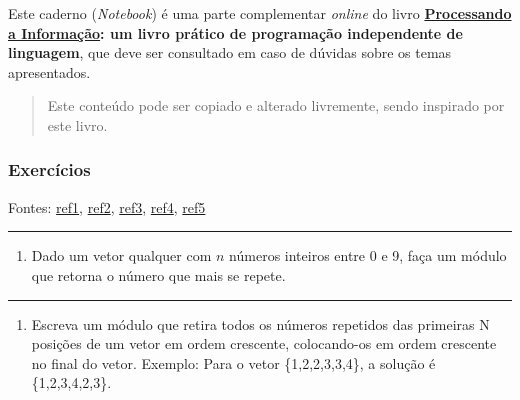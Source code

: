 \documentclass[12pt,a4paper]{article}
\renewcommand{\linethickness}{0.05em}
\providecommand{\tightlist}{%
      \setlength{\itemsep}{0pt}\setlength{\parskip}{0pt}}
\begin{document}
Este caderno (\emph{Notebook}) é uma parte complementar \emph{online} do
livro
\textbf{\href{https://editora.ufabc.edu.br/matematica-e-ciencias-da-computacao/58-processando-a-informacao}{Processando
a Informação}: um livro prático de programação independente de
linguagem}, que deve ser consultado em caso de dúvidas sobre os temas
apresentados.

\begin{quote}
Este conteúdo pode ser copiado e alterado livremente, sendo inspirado
por este livro.
\end{quote}

    \hypertarget{exercuxedcios}{%
\subsubsection{Exercícios}\label{exercuxedcios}}

Fontes:
\href{http://www.deinf.ufma.br/~csalles/prog/prog_lista2.pdf}{ref1},
\href{http://www.sistemas24horas.com.br/aulas/files_dic1/lista-exercicios-vetores-1.pdf}{ref2},
\href{https://fit.faccat.br/~fpereira/apostilas/exerc_resp_alg_mar2007.pdf}{ref3},
\href{https://docplayer.com.br/54457072-Laboratorio-de-programacao-a-exercicios-sobre-vetores-e-matrizes.html}{ref4},
\href{https://docplayer.com.br/21195395-Exercicios-vetores-e-matrizes.html}{ref5}

    \begin{center}\rule{0.5\linewidth}{\linethickness}\end{center}

\begin{enumerate}
\def\labelenumi{\arabic{enumi}.}
\tightlist
\item
  Dado um vetor qualquer com \(n\) números inteiros entre 0 e 9, faça um
  módulo que retorna o número que mais se repete.
\end{enumerate}

    \begin{center}\rule{0.5\linewidth}{\linethickness}\end{center}

\begin{enumerate}
\def\labelenumi{\arabic{enumi}.}
\setcounter{enumi}{1}
\tightlist
\item
  Escreva um módulo que retira todos os números repetidos das primeiras
  N posições de um vetor em ordem crescente, colocando-os em ordem
  crescente no final do vetor. Exemplo: Para o vetor \{1,2,2,3,3,4\}, a
  solução é \{1,2,3,4,2,3\}.
\end{enumerate}
\end{document}
